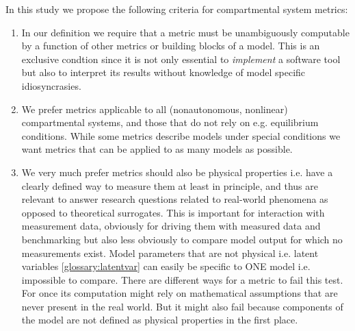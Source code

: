 In this study we propose the following criteria for compartmental system metrics:
\begin{enumerate}
  \item
    \label{enum:function}
    In our definition we require that a metric must be unambiguously computable by a function of other metrics or building blocks of a model.    This is an exclusive condtion since it is not only essential to \emph{implement} a software tool but also to interpret its results without knowledge of model specific idiosyncrasies.
  \item
    \label{enum:general}
    We prefer metrics applicable to all (nonautonomous, nonlinear) compartmental systems, and those that do not rely on e.g. equilibrium conditions. While some metrics describe models under special conditions we want metrics that can be applied to as many models as possible.  
  \item
    \label{enum:measurable}
  
    We very much prefer metrics should also be physical properties i.e. have a clearly
    defined way to measure them at least in principle, and thus are relevant to
    answer research questions related to real-world phenomena as opposed to
    theoretical surrogates. 
    This is important for interaction with measurement data, obviously for driving them with measured data  and benchmarking 
    but also less obviously to compare model output for which no measurements exist.  
    Model parameters that are not physical i.e. latent variables \ref{glossary:latentvar} 
    can easily be specific to ONE model i.e. impossible to compare. 
    There are different ways for a metric to fail this
    test. For once its computation might rely on mathematical assumptions that
    are never present in the real world. But it might also fail because
    components of the model are not defined as physical properties in the first
    place.
   
\end{enumerate}

